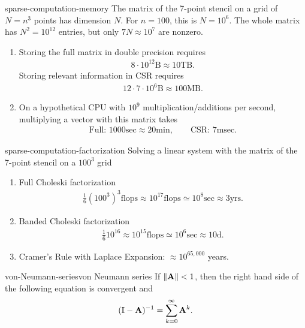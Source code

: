 \begin{Example}{sparse-computation-memory}
  The matrix of the 7-point stencil on a grid of $N=n^3$ points has
  dimension $N$. For $n=100$, this is $N=10^6$. The whole matrix has
  $N^2=10^{12}$ entries, but only $7N \approx 10^7$ are nonzero.
  \begin{enumerate}
  \item Storing the full matrix in double precision requires
    \begin{gather}
     8\cdot 10^{12}\text{B} \approx 10\text{TB}. 
    \end{gather}
    Storing relevant information in
    CSR requires
    \begin{gather}
      12\cdot7\cdot 10^6\text{B} \approx 100\text{MB}.
    \end{gather}
  \item On a hypothetical CPU with $10^9$ multiplication/additions per second, multiplying a vector with this matrix takes
    \begin{gather}
      \text{Full: } 1000\text{sec} \approx 20\text{min},
      \qquad
      \text{CSR: } 7\text{msec}.
    \end{gather}
  \end{enumerate}
\end{Example}

\begin{Example}{sparse-computation-factorization}
  Solving a linear system with the matrix of the 7-point stencil on a $100^3$ grid
  \begin{enumerate}
  \item Full Choleski factorization
    \begin{gather}
      \frac16 \left(100^3\right)^3\text{flops}\approx 10^{17}\text{flops}
      \simeq 10^8\text{sec} \approx 3\text{yrs.}
    \end{gather}
  \item Banded Choleski factorization
    \begin{gather}
      \frac16 10^{16} \approx 10^{15}\text{flops}
      \simeq 10^6\text{sec} \approx 10\text{d}.
    \end{gather}
  \item Cramer's Rule with Laplace Expansion: $\approx 10^{65,000}$ years.
  \end{enumerate}
\end{Example}


\begin{Theorem*}{von-Neumann-series}{von Neumann series}
  If $\lVert\mathbf A\rVert<1$, then the right hand side of the following
  equation is convergent and
  \begin{gather}
    (\mathbb I-\mathbf A)^{-1} = \sum_{k=0}^{\infty} \mathbf A^k.
  \end{gather}
\end{Theorem*}


